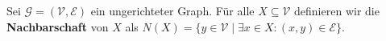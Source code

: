 \begin{definition}[Nachbarschaft]\label{def:nachbarschaft}
Sei $\mathcal{G} = (\mathcal{V}, \mathcal{E})$ ein ungerichteter Graph.
Für alle $X \subseteq \mathcal{V}$ definieren wir die \textbf{Nachbarschaft}
von $X$ als $N(X) = \{y \in \mathcal{V} \mid \exists x \in X : (x, y) \in \mathcal{E}\}$.\textnormal{\cite[S.~735, Übung]{cormen:matchings}}
\end{definition}
